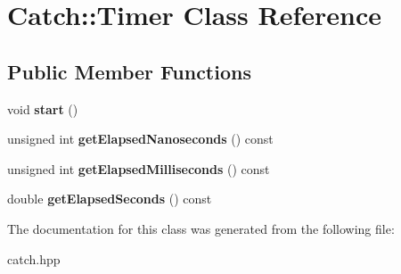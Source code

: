 \hypertarget{classCatch_1_1Timer}{
\section{Catch::Timer Class Reference}
\label{classCatch_1_1Timer}
}
\subsection*{Public Member Functions}
\begin{DoxyCompactItemize}
\item 
\hypertarget{classCatch_1_1Timer_a0a56e879e43f36c102bf9ea8b5fc8b72}{
void {\bfseries start} ()}
\label{classCatch_1_1Timer_a0a56e879e43f36c102bf9ea8b5fc8b72}

\item 
\hypertarget{classCatch_1_1Timer_ad88ea4dc75a07e5c6d870f5f979663a1}{
unsigned int {\bfseries getElapsedNanoseconds} () const }
\label{classCatch_1_1Timer_ad88ea4dc75a07e5c6d870f5f979663a1}

\item 
\hypertarget{classCatch_1_1Timer_a4cf3f9fbee9c76e87d989d9bc6913b68}{
unsigned int {\bfseries getElapsedMilliseconds} () const }
\label{classCatch_1_1Timer_a4cf3f9fbee9c76e87d989d9bc6913b68}

\item 
\hypertarget{classCatch_1_1Timer_a8500ef3481a9bf6ae81337972d9f95a3}{
double {\bfseries getElapsedSeconds} () const }
\label{classCatch_1_1Timer_a8500ef3481a9bf6ae81337972d9f95a3}

\end{DoxyCompactItemize}


The documentation for this class was generated from the following file:\begin{DoxyCompactItemize}
\item 
catch.hpp\end{DoxyCompactItemize}
